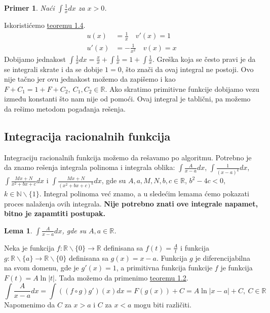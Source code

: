 \documentclass{article}
\newtheorem{lema}{Lema}[section]
\newtheorem{prim}{Primer}[section]
\begin{document}
\begin{primbox}
    \begin{prim}
        Naći $\int \frac{1}{x} dx$ za $x > 0$.
    \end{prim}
    Iskoristićemo \hyperref[teorema_1.4]{teoremu 1.4}.
    \begin{align*}
        u(x)  & = \frac{1}{x}\quad v'(x)   = 1 \\
        u'(x) & = -\frac{1}{x^2}\quad v(x) = x
    \end{align*}
    Dobijamo jednakost $\int \frac{1}{x} dx = \frac{x}{x} + \int \frac{1}{x} = 1+ \int\frac{1}{x}$. Greška koja se
    često pravi je da se integrali skrate i da se dobije $1 = 0$, što znači da ovaj integral ne postoji.
    Ovo nije tačno jer ovu jednakost možemo da zapišemo i kao $F+C_1 = 1+F+C_2,\ C_1,C_2\in\mathbb{R}$.
    Ako skratimo primitivne funkcije dobijamo vezu između konstanti što nam nije od pomoći. Ovaj integral
    je tablični, pa možemo da rešimo metodom pogađanja rešenja.
\end{primbox}

\subsection{Integracija racionalnih funkcija}
Integraciju racionalnih funkcija možemo da rešavamo po algoritmu.
Potrebno je da znamo rešenja integrala polinoma i integrala
oblika:
$\int \frac{A}{x-a}dx$, $\int\frac{1}{(x-a)^k}dx$,
$\int \frac{Mx+N}{x^2+bx + c}dx$ i $\int \frac{Mx + N}{(x^2 + bx + c)^k}dx$,
gde su $A,a,M,N,b,c\in\mathbb{R}$, $b^2-4c<0$, $k\in\mathbb{N}\backslash\{1\}$.
Integral polinoma već znamo, a u sledećim lemama ćemo
pokazati proces nalaženja ovih integrala. \textbf{Nije potrebno
    znati ove integrale napamet, bitno je zapamtiti
    postupak.}

\begin{lemabox}
    \begin{lema}
        \label{lema_1.1.1}
        $\int \frac{A}{x-a}dx$, gde su $A,a\in \mathbb{R}$.
    \end{lema}
    Neka je funkcija $f:\mathbb{R}\backslash\{0\}\longrightarrow\mathbb{R}$ definisana sa
    $f(t)=\frac{A}{t}$ i funkcija $g:\mathbb{R}\backslash\{a\}\longrightarrow\mathbb{R}\backslash\{0\}$
    definisana sa $g(x)=x-a$. Funkcija $g$ je diferencijabilna na svom domenu, gde je $g'(x)=1$, a primitivna funkcija
    funkcije $f$ je funkcija $F(t)=A\ln|t|$. Tada možemo da primenimo \hyperref[teorema_1.2]{teoremu 1.2}.
    \begin{equation*}
        \int \frac{A}{x-a}dx = \int ((f\circ g) g')(x)dx = F(g(x)) + C=A\ln|x-a| + C,\ C\in\mathbb{R}
    \end{equation*}
    Napomenimo da $C$ za $x > a$ i $C$ za $x < a$ mogu biti različiti.
\end{lemabox}
\end{document}
